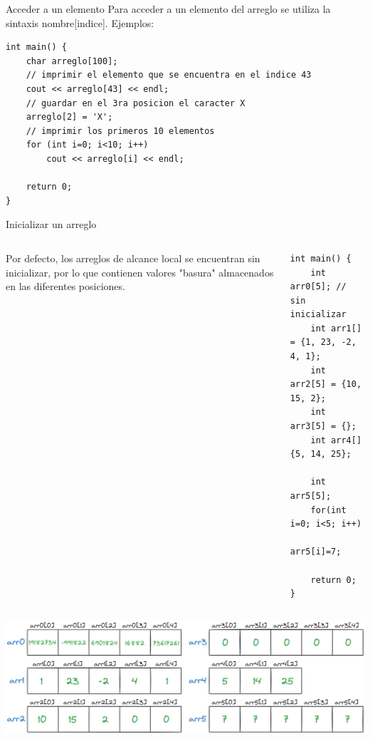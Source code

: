 \documentclass[12pt]{beamer}
\begin{document}
\begin{frame}[fragile]{Acceder a un elemento}
    Para acceder a un elemento del arreglo se utiliza la sintaxis \alert{nombre[indice]}. Ejemplos: \\
\begin{lstlisting}
int main() {
    char arreglo[100];
    // imprimir el elemento que se encuentra en el indice 43
    cout << arreglo[43] << endl;
    // guardar en el 3ra posicion el caracter X
    arreglo[2] = 'X';
    // imprimir los primeros 10 elementos
    for (int i=0; i<10; i++)
        cout << arreglo[i] << endl;
    
    return 0;
}
\end{lstlisting}
\end{frame}

\begin{frame}[fragile]{Inicializar un arreglo}
    \begin{columns}
        Por defecto, los arreglos de alcance local se encuentran sin inicializar, por lo que contienen valores "basura" almacenados en las diferentes posiciones.
        \begin{lstlisting}[basicstyle=\tiny]
int main() {
    int arr0[5]; // sin inicializar
    int arr1[] = {1, 23, -2, 4, 1};
    int arr2[5] = {10, 15, 2};
    int arr3[5] = {};
    int arr4[] {5, 14, 25};

    int arr5[5];
    for(int i=0; i<5; i++)
        arr5[i]=7;

    return 0;
}
\end{lstlisting}
        \end{columns}
        \includegraphics[width=\textwidth]{arrays.png}
\end{frame}
\end{document}
